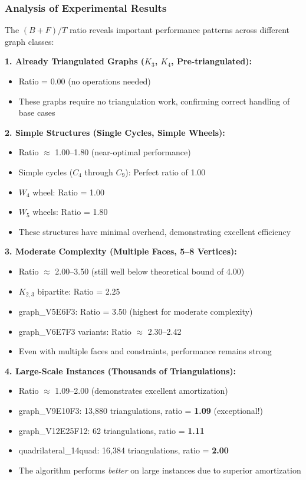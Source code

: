 \documentclass[12pt,a4paper]{article}
\theoremstyle{definition}
\theoremstyle{remark}
\begin{document}
\subsubsection{Analysis of Experimental Results}

The $(B+F)/T$ ratio reveals important performance patterns across different graph classes:

\textbf{1. Already Triangulated Graphs ($K_3$, $K_4$, Pre-triangulated):}
\begin{itemize}
    \item Ratio = 0.00 (no operations needed) \checkmark
    \item These graphs require no triangulation work, confirming correct handling of base cases
\end{itemize}

\textbf{2. Simple Structures (Single Cycles, Simple Wheels):}
\begin{itemize}
    \item Ratio $\approx$ 1.00--1.80 (near-optimal performance)
    \item Simple cycles ($C_4$ through $C_9$): Perfect ratio of 1.00
    \item $W_4$ wheel: Ratio = 1.00
    \item $W_5$ wheels: Ratio = 1.80
    \item These structures have minimal overhead, demonstrating excellent efficiency
\end{itemize}

\textbf{3. Moderate Complexity (Multiple Faces, 5--8 Vertices):}
\begin{itemize}
    \item Ratio $\approx$ 2.00--3.50 (still well below theoretical bound of 4.00)
    \item $K_{2,3}$ bipartite: Ratio = 2.25
    \item graph\_V5E6F3: Ratio = 3.50 (highest for moderate complexity)
    \item graph\_V6E7F3 variants: Ratio $\approx$ 2.30--2.42
    \item Even with multiple faces and constraints, performance remains strong
\end{itemize}

\textbf{4. Large-Scale Instances (Thousands of Triangulations):}
\begin{itemize}
    \item Ratio $\approx$ 1.09--2.00 (demonstrates excellent amortization)
    \item graph\_V9E10F3: 13,880 triangulations, ratio = \textbf{1.09} (exceptional!)
    \item graph\_V12E25F12: 62 triangulations, ratio = \textbf{1.11}
    \item quadrilateral\_14quad: 16,384 triangulations, ratio = \textbf{2.00}
    \item The algorithm performs \emph{better} on large instances due to superior amortization
\end{itemize}
\end{document}

